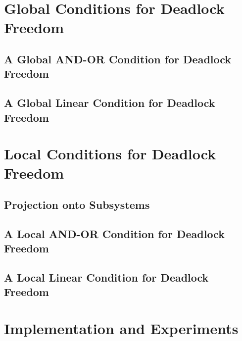 \documentclass[prodmode,acmtosem]{acmsmall} %
\begin{document}
\section{Global Conditions for Deadlock Freedom}
\label{s:global}

   \subsection{A Global AND-OR Condition for Deadlock Freedom}
   \label{s:global.ANDOR}
   

   \subsection{A Global Linear Condition for Deadlock Freedom}
   \label{s:globCondition}
   \label{s:global.Linear}
   


\section{Local Conditions for Deadlock Freedom}
\label{s:local}

   \label{s:local.preamble}
   

   \subsection{Projection onto Subsystems}
   \label{s:projection}
   

   \subsection{A Local AND-OR Condition for Deadlock Freedom}
   \label{s:ANDORcond}
   

   \subsection{A Local Linear Condition for Deadlock Freedom}
   \label{s:condition}
   


\section{Implementation and Experiments}
\label{s:impl}
\end{document}
